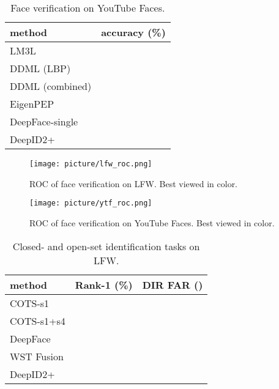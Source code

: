 \documentclass[10pt,twocolumn,letterpaper]{article}
\begin{document}
\begin{table}[t]
\caption{Face verification on YouTube Faces.}
\label{tab:youtube}
\vspace{-0.1in}
\begin{center}
\begin{tabular}{p{100pt}|p{100pt}}
\toprule
method & accuracy (\%) \\
\midrule
LM3L \cite{hu2014b} &  \\
DDML (LBP) \cite{hu2014a} &  \\
DDML (combined) \cite{hu2014a} &  \\
EigenPEP \cite{li2014} &  \\
DeepFace-single \cite{taigman2014a} &  \\
DeepID2+ &  \\
\bottomrule
\end{tabular}
\end{center}
\vspace{-0.1in}
\end{table}

\begin{figure}[!h]
\begin{center}
\texttt{[image: picture/lfw\_roc.png]}
\end{center}
\vspace{-0.15in}
\caption{ROC  of face verification on LFW. Best viewed in color.}
\label{fig:lfw}
\vspace{-0.1in}
\end{figure}

\begin{figure}[!h]
\begin{center}
\texttt{[image: picture/ytf\_roc.png]}
\end{center}
\vspace{-0.15in}
\caption{ROC  of face verification on YouTube Faces. Best viewed in color.}
\label{fig:youtube}
\vspace{-0.05in}
\end{figure}

\begin{table}[t]
\caption{Closed- and open-set identification tasks on LFW. }
\vspace{-0.1in}
\label{tab:lfw_id}
\begin{center}
\begin{tabular}{p{80pt}|p{50pt}|p{50pt}}
\toprule
method & Rank-1 (\%) & DIR   FAR () \\
\midrule
COTS-s1 \cite{best-rowden2014} &  &  \\
COTS-s1+s4 \cite{best-rowden2014} &  &  \\
DeepFace \cite{taigman2014a} &  &  \\
WST Fusion \cite{taigman2014b} &  &  \\
DeepID2+ &  &  \\
\bottomrule
\end{tabular}
\end{center}
\vspace{-0.1in}
\end{table}
\end{document}
